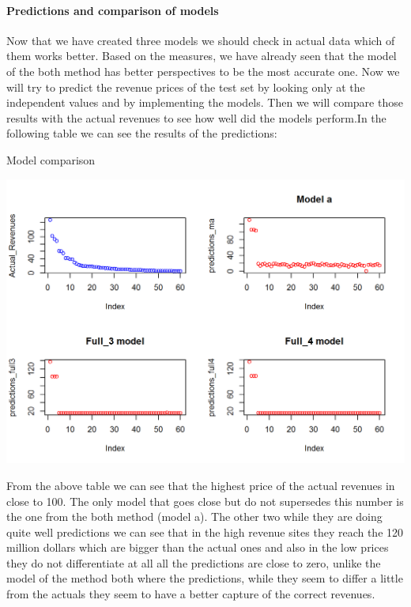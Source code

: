 \documentclass{article}
\begin{document}
\paragraph{Predictions and comparison of models}
Now that we have created three models we should check in actual data which of them works better. Based on the measures, we have already seen that the model of the both method has better perspectives to be the most accurate one. Now we will try to predict the revenue prices of the test set by looking only at the independent values and by implementing the models. Then we will compare those results with the actual revenues to see how well did the models perform.In the following table we can see the results of the predictions:
\begin{table}[H]
\centering
\caption{Model comparison}
\begin{center}
\includegraphics[scale=0.6]{../R/photos/85_pred_mod.png}    \\
\end{center}
\end{table}
From the above table we can see that the highest price of the actual revenues in close to 100. The only model that goes close but do not supersedes this number is the one from the both method (model a). The other two while they are doing quite well predictions we can see that in the high revenue sites they reach the 120 million dollars which are bigger than the actual ones and also in the low prices they do not differentiate at all all the predictions are close to zero, unlike the model of the method both where the predictions, while they seem to differ a little from the actuals they seem to have a better capture of the correct revenues.\\
\end{document}
